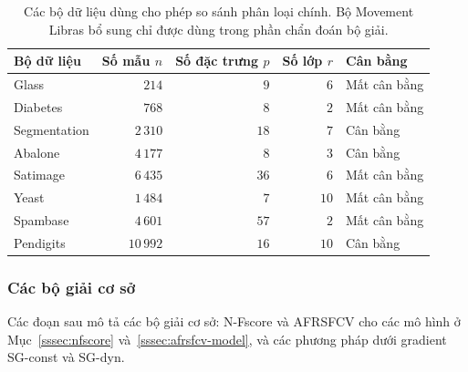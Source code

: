 \begin{table}[htbp]
\centering
\caption{Các bộ dữ liệu dùng cho phép so sánh phân loại chính. Bộ Movement Libras bổ sung chỉ được dùng trong phần chẩn đoán bộ giải.}\label{tab:datasets}
\begin{tabular}{lrrrl}
\toprule
Bộ dữ liệu   & Số mẫu $n$ & Số đặc trưng $p$ & Số lớp $r$ & Cân bằng    \\
\midrule
Glass        & $214$       & $9$          & $6$         & Mất cân bằng \\
Diabetes     & $768$       & $8$          & $2$         & Mất cân bằng \\
Segmentation & $2\,310$    & $18$         & $7$         & Cân bằng   \\
Abalone      & $4\,177$    & $8$          & $3$         & Cân bằng   \\
Satimage     & $6\,435$    & $36$         & $6$         & Mất cân bằng \\
Yeast        & $1\,484$    & $7$          & $10$        & Mất cân bằng \\
Spambase     & $4\,601$    & $57$         & $2$         & Mất cân bằng \\
Pendigits    & $10\,992$   & $16$         & $10$        & Cân bằng   \\
\bottomrule
\end{tabular}
\end{table}
\subsubsection{Các bộ giải cơ sở}\label{sssec:baselines}
Các đoạn sau mô tả các bộ giải cơ sở: N-Fscore và AFRSFCV cho các mô hình ở Mục~\ref{sssec:nfscore} và~\ref{sssec:afrsfcv-model}, và các phương pháp dưới gradient SG-const và SG-dyn.


